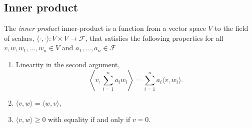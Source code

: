 \subsection{Inner product}


\begin{definition} \label{inner_product}
The \emph{inner product}  \gls{inner-product} is a function from a vector space $V$ to the field of scalars, $\langle \cdot, \cdot \rangle : V \times V \rightarrow \mathcal{F}$,  that satisfies the following properties for all $v, w, w_1, \ldots, w_n \in V$ and $a_1, \ldots, a_n \in \mathcal{F}$

\begin{enumerate}
  \item Linearity in the second argument,$$ \left\langle v, \sum_{i=1}^n a_i w_i\right\rangle = \sum_{i=1}^n a_i \langle v, w_i\rangle. $$
  \item $\langle v,w \rangle = \overline{\langle w,v \rangle} $, 
  \item  $\langle v,w \rangle \geq 0 $ with equality if and only if $v = 0$.
\end{enumerate}
\end{definition}



